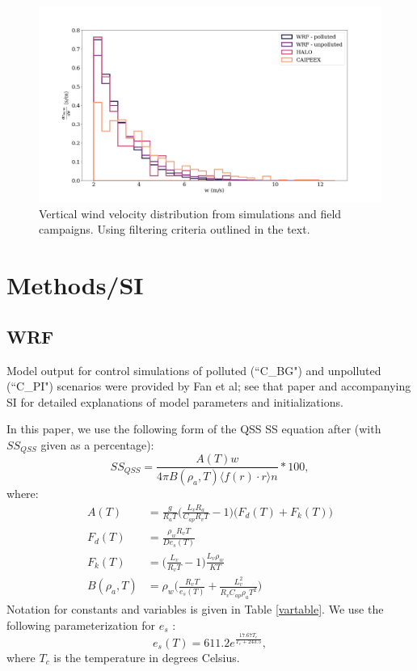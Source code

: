 \documentclass{article}
\begin{document}
\begin{figure}[ht]
    \centering
    \includegraphics[width=12cm]{revmywrf/v1_FINAL_combined_w_hist_figure.png}
    \caption{Vertical wind velocity distribution from simulations and field campaigns. Using filtering criteria outlined in the text.}
    \label{combinedwhist}
\end{figure}

\clearpage
\newpage

\section{Methods/SI}

\subsection{WRF}

Model output for control simulations of polluted (``C\_BG") and unpolluted (``C\_PI") scenarios were provided by Fan et al; see that paper and accompanying SI for detailed explanations of model parameters and initializations.

In this paper, we use the following form of the QSS SS equation after \cite{Rogers1989} (with $SS_{QSS}$ given as a percentage):
\begin{equation}
\label{fullss}
SS_{QSS} = \frac{A(T) w}{4\pi B(\rho_a, T) \langle f(r)\cdot r\rangle n}*100,
\end{equation}
where:
\begin{align}
A(T) &= \frac{g}{R_a T}\Big(\frac{L_v R_a}{C_{ap} R_v T} - 1\Big)\big(F_d(T) + F_k(T)\big)\nonumber\\
F_d(T) &= \frac{\rho_w R_v T}{D e_s(T)}\nonumber\\
F_k(T) &= \Big(\frac{L_v}{R_v T} - 1\Big)\frac{L_v \rho_w}{K T}\nonumber\\
B(\rho_a, T) &= \rho_w\Big(\frac{R_v T}{e_s(T)} + \frac{L_v^2}{R_v C_{ap} \rho_a T^2}\Big)
\end{align}
Notation for constants and variables is given in Table \ref{vartable}. We use the following parameterization for $e_s$ \cite{Rogers1989}:
\begin{equation}
e_s(T) = 611.2e^{\frac{17.67T_c}{T_c + 243.5}},
\end{equation}
where $T_c$ is the temperature in degrees Celsius.
\end{document}
